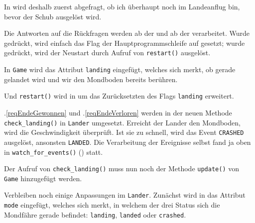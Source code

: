 In  wird deshalb zuerst abgefragt, ob ich überhaupt noch im Landeanflug bin, bevor der Schub ausgelöst wird. 

Die Antworten auf die Rückfragen werden ab der  und ab der  verarbeitet. Wurde  gedrückt, wird einfach das Flag der Hauptprogrammschleife auf \false{} gesetzt; wurde  gedrückt, wird der Neustart durch Aufruf von \texttt{restart()} ausgelöst.



In \texttt{Game} wird das Attribut \texttt{landing} eingefügt, welches sich merkt, ob gerade gelandet wird und wir den Mondboden bereits berühren.


Und \texttt{restart()} wird in  um das Zurücksetzten des Flags \texttt{landing} erweitert.



.\ref{reqEndeGewonnen} und .\ref{reqEndeVerloren} werden in der neuen Methode \texttt{check\_landing()} in \texttt{Lander} umgesetzt. Erreicht der Lander den Mondboden, wird die Geschwindigkeit überprüft. Ist sie zu schnell, wird das Event \texttt{CRASHED} ausgelöst, ansonsten \texttt{LANDED}. Die Verarbeitung der Ereignisse selbst fand ja oben in \texttt{watch\_for\_events()} () statt.


Der Aufruf von \texttt{check\_landing()} muss nun noch der Methode \texttt{update()} von \texttt{Game} hinzugefügt werden.

\newpage
{} 

Verbleiben noch einige Anpassungen im \texttt{Lander}. Zunächst wird in  das Attribut \texttt{mode} eingefügt, welches sich merkt, in welchem der drei Status sich die Mondfähre gerade befindet: \texttt{landing}, \texttt{landed} oder \texttt{crashed}.

